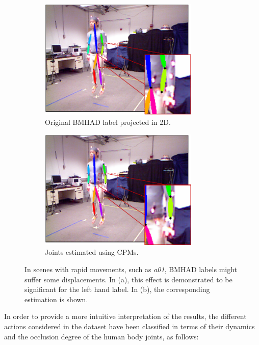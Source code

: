 \begin{figure}[h]\centering
    \begin{subfigure}{0.49\textwidth}\centering
        \includegraphics[height=5.75cm]{figures/2d_gt.png} 
        \caption{Original BMHAD label projected in 2D.}
        \label{subfig:2d_gt}
    \end{subfigure}
    \begin{subfigure}{0.49\textwidth}\centering
        \includegraphics[height=5.75cm]{figures/2d_cpm.png}
        \caption{Joints estimated using CPMs.}
        \label{subfig:2d_cpm}
    \end{subfigure}
    \caption{In scenes with rapid movements, such as \textit{a01}, BMHAD labels might suffer some displacements. In (a), this effect is demonstrated to be significant for the left hand label. In (b), the corresponding estimation is shown.}
    \label{fig:wrong_hands}
\end{figure}

In order to provide a more intuitive interpretation of the results, the different actions considered in the dataset have been classified in terms of their dynamics and the occlusion degree of the human body joints, as follows:

